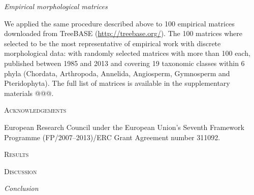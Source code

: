 \documentclass[12pt,letterpaper]{article}
\renewcommand{\section}[1]{%
\bigskip
\begin{center}
\begin{Large}
\normalfont\scshape #1
\medskip
\end{Large}
\end{center}}
\renewcommand{\subsection}[1]{%
\bigskip
\begin{center}
\begin{large}
\normalfont\itshape #1
\end{large}
\end{center}}
\begin{document}
\cite{Guillerme2016146}

\subsection{Empirical morphological matrices}

We applied the same procedure described above to 100 empirical matrices downloaded from TreeBASE (\url{http://treebase.org/}).
The 100 matrices where selected to be the most representative of empirical work with discrete morphological data: with randomly selected matrices with more than 100 each, published between 1985 and 2013 and covering 19 taxonomic classes within 6 phyla (Chordata, Arthropoda, Annelida, Angiosperm, Gymnosperm and Pteridophyta).
The full list of matrices is available in the supplementary materials @@@.

\section{Acknowledgements}
European Research Council under the European Union’s Seventh Framework Programme (FP/2007–2013)/ERC Grant Agreement number 311092.


\section{Results}


\section{Discussion}


\subsection{Conclusion}




\end{document}
